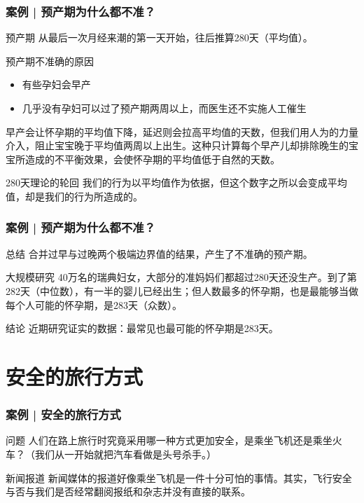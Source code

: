 \begin{frame}
  \frametitle{案例 | 预产期为什么都不准？}
  \begin{block}{预产期}
    从最后一次月经来潮的第一天开始，往后推算280天（平均值）。
  \end{block}
  \pause
  \begin{block}{预产期不准确的原因}
    \begin{itemize}
      \item 有些孕妇会早产
      \item 几乎没有孕妇可以过了预产期两周以上，而医生还不实施人工催生
    \end{itemize}
    早产会让怀孕期的平均值下降，延迟则会拉高平均值的天数，但我们用人为的力量介入，阻止宝宝晚于平均值两周以上出生。这种只计算每个早产儿却排除晚生的宝宝所造成的不平衡效果，会使怀孕期的平均值低于自然的天数。
  \end{block}
  \pause
  \begin{block}{280天理论的轮回}
    我们的行为以平均值作为依据，但这个数字之所以会变成平均值，却是我们的行为所造成的。
  \end{block}
\end{frame}

\begin{frame}
  \frametitle{案例 | 预产期为什么都不准？}
  \begin{block}{总结}
    合并过早与过晚两个极端边界值的结果，产生了不准确的预产期。
  \end{block}
  \pause
  \begin{block}{大规模研究}
    40万名的瑞典妇女，大部分的准妈妈们都超过280天还没生产。到了第282天（中位数），有一半的婴儿已经出生；但人数最多的怀孕期，也是最能够当做每个人可能的怀孕期，是283天（众数）。
  \end{block}
  \pause
  \begin{block}{结论}
    近期研究证实的数据：最常见也最可能的怀孕期是283天。
  \end{block}
\end{frame}

\section{安全的旅行方式}
\begin{frame}
  \frametitle{案例 | 安全的旅行方式}
  \begin{block}{问题}
    人们在路上旅行时究竟采用哪一种方式更加安全，是乘坐飞机还是乘坐火车？（我们从一开始就把汽车看做是头号杀手。）
  \end{block}
  \pause
  \begin{block}{新闻报道}
    新闻媒体的报道好像乘坐飞机是一件十分可怕的事情。其实，飞行安全与否与我们是否经常翻阅报纸和杂志并没有直接的联系。
  \end{block}
\end{frame}

